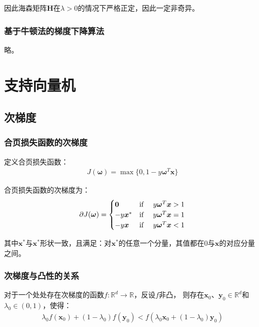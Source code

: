 \documentclass[12pt, a4paper]{article}
\newcommand{\imat}{\bm}
\newcommand{\ivec}{\bm}
\newcommand{\omegav}{\ivec{\omega}}
\newcommand{\xv}{\ivec{x}}
\newcommand{\yv}{\ivec{y}}
\begin{document}
        因此海森矩阵$\imat{H}$在$\lambda > 0$的情况下严格正定，因此一定非奇异。

    \subsubsection{基于牛顿法的梯度下降算法}

        略。

\section{支持向量机}

    \subsection{次梯度}

    \subsubsection{合页损失函数的次梯度}

        定义合页损失函数：
        \begin{equation}\begin{aligned}
        J(\omegav) = \max\{0, 1 - y \omegav^T \xv\}
        \end{aligned}\end{equation}

        合页损失函数的次梯度为：
        \begin{equation}\begin{aligned}
        \partial J(\omegav) =
        \begin{cases}
        \ivec{0}      & \text{if \quad} y \omegav^T \xv > 1 \\
        -y \ivec{x}^* & \text{if \quad} y \omegav^T \xv = 1 \\
        -y \xv        & \text{if \quad} y \omegav^T \xv < 1
        \end{cases}
        \end{aligned}\end{equation}

        其中$\xv^*$与$\xv^*$形状一致，且满足：对$\xv^*$的任意一个分量，其值都在0与$\xv$的对应分量之间。

    \subsubsection{次梯度与凸性的关系}

        对于一个处处存在次梯度的函数$f: \mathbb{R}^d \rightarrow \mathbb{R}$，反设$f$非凸，
        则存在$\xv_0 \text{、} \yv_0 \in \mathbb{R}^d$和$\lambda_0 \in (0, 1)$，使得：
        \begin{align*}
        \lambda_0 f(\xv_0) + (1 - \lambda_0) f(\yv_0) < f(\lambda_0 \xv_0 + (1 - \lambda_0) \yv_0)
        \end{align*}
\end{document}
